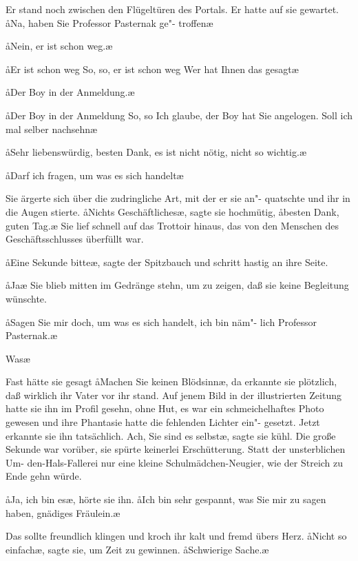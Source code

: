 Er stand noch zwischen den Flügeltüren des Portals. Er hatte
auf sie gewartet. \aa{}Na, haben Sie Professor Pasternak ge"-%
troffen\frag{}\ae{}

\aa{}Nein, er ist schon weg.\ae{}

\aa{}Er ist schon weg\frag{} So, so, er ist schon weg\frag{} Wer hat Ihnen
das gesagt\frag{}\ae{}

\aa{}Der Boy in der Anmeldung.\ae{}

\aa{}Der Boy in der Anmeldung\frag{} So, so\frag{} Ich glaube, der Boy
hat Sie angelogen. Soll ich mal selber nachsehn\frag{}\ae{}

\aa{}Sehr liebenswürdig, besten Dank, es ist nicht nötig, nicht so
wichtig.\ae{}

\aa{}Darf ich fragen, um was es sich handelt\frag{}\ae{}

Sie ärgerte sich über die zudringliche Art, mit der er sie an"-%
quatschte und ihr in die Augen stierte. \aa{}Nichts Geschäftliches\ae{},\eingriff{eS69-1}{Geschäftliches\ae{}, ] Geschäftliches,\ae{}}
sagte sie hochmütig, \aa{}besten Dank, guten Tag.\ae{} Sie lief
schnell auf das Trottoir hinaus, das von den Menschen des
Geschäftsschlusses überfüllt war.

\aa{}Eine Sekunde bitte\ae{}, sagte der Spitzbauch und schritt hastig
an ihre Seite.

\aa{}Ja\frag{}\ae{} Sie blieb mitten im Gedränge stehn, um zu zeigen,
daß sie keine Begleitung wünschte.

\aa{}Sagen Sie mir doch, um was es sich handelt, ich bin näm"-%
lich Professor Pasternak.\ae{}

\aanah{}Was\frag{}\ae{}

Fast hätte sie gesagt\dopp{} \aa{}Machen Sie keinen Blödsinn\ae{}, da
erkannte sie plötzlich, daß wirklich ihr Vater vor ihr stand.
Auf jenem Bild in der illustrierten Zeitung hatte sie ihn im
Profil gesehn, ohne Hut, es war ein schmeichelhaftes Photo
gewesen und ihre Phantasie hatte die fehlenden Lichter ein"-%
gesetzt. Jetzt erkannte sie ihn tatsächlich. \aanah{}Ach, Sie sind es
selbst\frag{}\ae{}, sagte sie kühl. Die große Sekunde war vorüber, sie
spürte keinerlei Erschütterung. Statt der unsterblichen Um-%
den-Hals-Fallerei nur eine kleine Schulmädchen-Neugier, wie
der Streich zu Ende gehn würde.

\aa{}Ja, ich bin es\ae{}, hörte sie ihn. \aa{}Ich bin sehr gespannt, was
Sie mir zu sagen haben, gnädiges Fräulein.\ae{}

Das sollte freundlich klingen und kroch ihr kalt und fremd
übers Herz. \aa{}Nicht so einfach\ae{}, sagte sie, um Zeit zu gewinnen.
\aa{}Schwierige Sache.\ae{}

